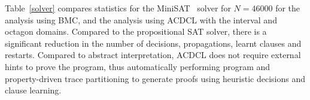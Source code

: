 Table~\ref{solver} compares statistics for the MiniSAT~\cite{minisat}
solver for $N=46000$ for the analysis using BMC, and the analysis using
ACDCL with the interval and octagon domains.  Compared to the propositional
SAT solver, there is a significant reduction in the number of decisions,
propagations, learnt clauses and restarts.  Compared to abstract
interpretation, ACDCL does not require external hints to prove the program,
thus automatically performing program and property-driven trace partitioning
to generate proofs using heuristic decisions and clause learning.
